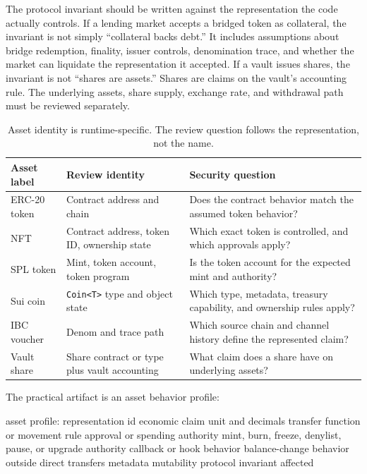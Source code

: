 The protocol invariant should be written against the representation the code actually controls. If a lending market accepts a bridged token as collateral, the invariant is not simply ``collateral backs debt.'' It includes assumptions about bridge redemption, finality, issuer controls, denomination trace, and whether the market can liquidate the representation it accepted. If a vault issues shares, the invariant is not ``shares are assets.'' Shares are claims on the vault's accounting rule. The underlying assets, share supply, exchange rate, and withdrawal path must be reviewed separately.

\begin{table}[htbp]
\centering
\small
\renewcommand{\arraystretch}{1.16}
\begin{tabularx}{\textwidth}{@{}>{\RaggedRight\arraybackslash}p{}>{\RaggedRight\arraybackslash}p{}X@{}}
\toprule
Asset label & Review identity & Security question \\
\midrule
ERC-20 token & Contract address and chain & Does the contract behavior match the assumed token behavior? \\
NFT & Contract address, token ID, ownership state & Which exact token is controlled, and which approvals apply? \\
SPL token & Mint, token account, token program & Is the token account for the expected mint and authority? \\
Sui coin & \texttt{Coin<T>} type and object state & Which type, metadata, treasury capability, and ownership rules apply? \\
IBC voucher & Denom and trace path & Which source chain and channel history define the represented claim? \\
Vault share & Share contract or type plus vault accounting & What claim does a share have on underlying assets? \\
\bottomrule
\end{tabularx}
\caption{Asset identity is runtime-specific. The review question follows the representation, not the name.}
\end{table}

The practical artifact is an asset behavior profile:

\begin{codeblock}
asset profile:
    representation id
    economic claim
    unit and decimals
    transfer function or movement rule
    approval or spending authority
    mint, burn, freeze, denylist, pause, or upgrade authority
    callback or hook behavior
    balance-change behavior outside direct transfers
    metadata mutability
    protocol invariant affected
\end{codeblock}

